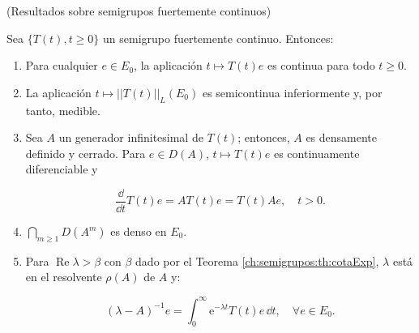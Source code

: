 \begin{Teorema}{(Resultados sobre semigrupos fuertemente continuos)}
\label{ch:semigrupos:th:resSemiFuerteCont}

Sea $\{T(t), t \geq 0\}$ un semigrupo fuertemente continuo. Entonces:
\begin{enumerate}
    \item Para cualquier $e \in E_0$, la aplicación $t \mapsto T(t)e$ es continua para todo $t \ge 0$.

    \item La aplicación $t \mapsto ||T(t)||_L(E_0)$ es semicontinua inferiormente y, por tanto, medible.

    \item Sea $A$ un generador infinitesimal de $T(t)$; entonces, $A$ es densamente definido y cerrado. Para $e \in D(A)$, $t \mapsto T(t) e$ es continuamente diferenciable y

    \[\frac{\dd}{\dd t}T(t)e = AT(t)e = T(t)Ae, \quad t > 0.\]

    \item $\bigcap_{m \geq 1} D(A^m)$ es denso en $E_0$.

    \item Para $\operatorname{Re}\lambda > \beta$ con $\beta$ dado por el Teorema \ref{ch:semigrupos:th:cotaExp}, $\lambda$ está en el resolvente $\rho(A)$ de $A$ y:

    \[(\lambda - A)^{-1}e = \int_{0}^\infty \mathrm{e}^{-\lambda t}T(t) e \, \dd t, \quad \forall e \in E_0. \]
\end{enumerate}
\end{Teorema}

